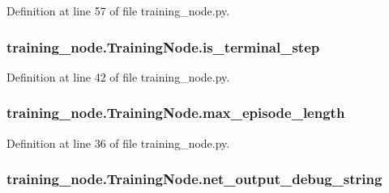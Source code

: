 Definition at line 57 of file training\+\_\+node.\+py.

\subsubsection[{\texorpdfstring{is\+\_\+terminal\+\_\+step}{is_terminal_step}}]{\setlength{\rightskip}{0pt plus 5cm}training\+\_\+node.\+Training\+Node.\+is\+\_\+terminal\+\_\+step}\hypertarget{classtraining__node_1_1_training_node_aa30ad32e868062b9e6eeccc27ad41bdd}{}\label{classtraining__node_1_1_training_node_aa30ad32e868062b9e6eeccc27ad41bdd}


Definition at line 42 of file training\+\_\+node.\+py.

\subsubsection[{\texorpdfstring{max\+\_\+episode\+\_\+length}{max_episode_length}}]{\setlength{\rightskip}{0pt plus 5cm}training\+\_\+node.\+Training\+Node.\+max\+\_\+episode\+\_\+length}\hypertarget{classtraining__node_1_1_training_node_a5d1780473359a3b1fd3ca9ec5a1fa5e1}{}\label{classtraining__node_1_1_training_node_a5d1780473359a3b1fd3ca9ec5a1fa5e1}


Definition at line 36 of file training\+\_\+node.\+py.

\subsubsection[{\texorpdfstring{net\+\_\+output\+\_\+debug\+\_\+string}{net_output_debug_string}}]{\setlength{\rightskip}{0pt plus 5cm}training\+\_\+node.\+Training\+Node.\+net\+\_\+output\+\_\+debug\+\_\+string}\hypertarget{classtraining__node_1_1_training_node_a9aa59ff1a63634d0305faf83b43092c9}{}\label{classtraining__node_1_1_training_node_a9aa59ff1a63634d0305faf83b43092c9}


